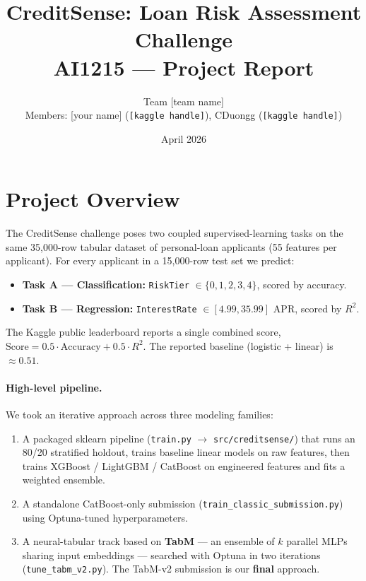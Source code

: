 \documentclass[11pt,a4paper]{article}
\title{\textbf{CreditSense: Loan Risk Assessment Challenge}\\[2pt]\large AI1215 --- Project Report}
\author{Team [team name] \\ \small Members: [your name] (\texttt{[kaggle handle]}), CDuongg (\texttt{[kaggle handle]})}
\date{April 2026}
\begin{document}
\maketitle

\section{Project Overview}

The CreditSense challenge poses two coupled supervised-learning tasks on the same 35{,}000-row tabular dataset of personal-loan applicants (55 features per applicant). For every applicant in a 15{,}000-row test set we predict:

\begin{itemize}[leftmargin=*,nosep]
  \item \textbf{Task A --- Classification:} \texttt{RiskTier} $\in \{0,1,2,3,4\}$, scored by accuracy.
  \item \textbf{Task B --- Regression:} \texttt{InterestRate} $\in [4.99, 35.99]$ APR, scored by $R^2$.
\end{itemize}

The Kaggle public leaderboard reports a single combined score, $\text{Score} = 0.5 \cdot \text{Accuracy} + 0.5 \cdot R^2$. The reported baseline (logistic + linear) is $\approx 0.51$.

\paragraph{High-level pipeline.} We took an iterative approach across three modeling families:

\begin{enumerate}[leftmargin=*,nosep]
  \item A packaged sklearn pipeline (\texttt{train.py} $\rightarrow$ \texttt{src/creditsense/}) that runs an 80/20 stratified holdout, trains baseline linear models on raw features, then trains XGBoost / LightGBM / CatBoost on engineered features and fits a weighted ensemble.
  \item A standalone CatBoost-only submission (\texttt{train\_classic\_submission.py}) using Optuna-tuned hyperparameters.
  \item A neural-tabular track based on \textbf{TabM} --- an ensemble of $k$ parallel MLPs sharing input embeddings --- searched with Optuna in two iterations (\texttt{tune\_tabm\_v2.py}). The TabM-v2 submission is our \textbf{final} approach.
\end{enumerate}
\end{document}
